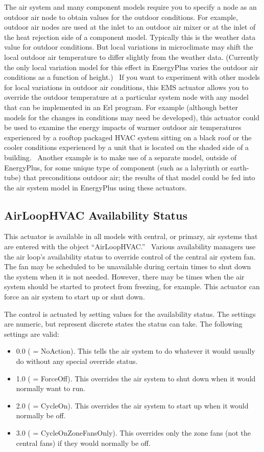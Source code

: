 The air system and many component models require you to specify a node as an outdoor air node to obtain values for the outdoor conditions. For example, outdoor air nodes are used at the inlet to an outdoor air mixer or at the inlet of the heat rejection side of a component model. Typically this is the weather data value for outdoor conditions. But local variations in microclimate may shift the local outdoor air temperature to differ slightly from the weather data. (Currently the only local variation model for this effect in EnergyPlus varies the outdoor air conditions as a function of height.)~ If you want to experiment with other models for local variations in outdoor air conditions, this EMS actuator allows you to override the outdoor temperature at a particular system node with any model that can be implemented in an Erl program. For example (although better models for the changes in conditions may need be developed), this actuator could be used to examine the energy impacts of warmer outdoor air temperatures experienced by a rooftop packaged HVAC system sitting on a black roof or the cooler conditions experienced by a unit that is located on the shaded side of a building.~ Another example is to make use of a separate model, outside of EnergyPlus, for some unique type of component (such as a labyrinth or earth-tube) that preconditions outdoor air; the results of that model could be fed into the air system model in EnergyPlus using these actuators.

\subsection{AirLoopHVAC Availability Status}\label{airloophvac-availability-status}

This actuator is available in all models with central, or primary, air systems that are entered with the object ``AirLoopHVAC.''~ Various availability managers use the air loop's availability status to override control of the central air system fan. The fan may be scheduled to be unavailable during certain times to shut down the system when it is not needed. However, there may be times when the air system should be started to protect from freezing, for example. This actuator can force an air system to start up or shut down.

The control is actuated by setting values for the availability status. The settings are numeric, but represent discrete states the status can take. The following settings are valid:

\begin{itemize}
\item
  0.0 ( = NoAction). This tells the air system to do whatever it would usually do without any special override status.
\item
  1.0 ( = ForceOff). This overrides the air system to shut down when it would normally want to run.
\item
  2.0 ( = CycleOn). This overrides the air system to start up when it would normally be off.
\item
  3.0 ( = CycleOnZoneFansOnly). This overrides only the zone fans (not the central fans) if they would normally be off.
\end{itemize}

